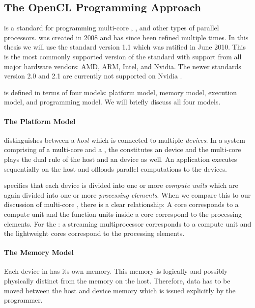 

\subsection{The OpenCL Programming Approach}
\OpenCL is a standard for programming multi-core \CPUs, \GPUs, and other types of parallel processors.
\OpenCL was created in 2008 and has since been refined multiple times.
In this thesis we will use the \OpenCL standard version 1.1 which was ratified in June 2010.
This is the most commonly supported version of the standard with support from all major hardware vendors: AMD, ARM, Intel, and Nvidia.
The newer \OpenCL standards version 2.0 and 2.1 are currently not supported on Nvidia \GPUs.

\OpenCL is defined in terms of four models: platform model, memory model, execution model, and programming model.
We will briefly discuss all four models.

\paragraph{The \OpenCL Platform Model}
\OpenCL distinguishes between a \emph{host} which is connected to multiple \emph{\OpenCL devices}.
In a system comprising of a multi-core \CPU and a \GPU, the \GPU constitutes an \OpenCL device and the multi-core \CPU plays the dual rule of the host and an \OpenCL device as well.
An \OpenCL application executes sequentially on the host and offloads parallel computations to the \OpenCL devices.

\OpenCL specifies that each device is divided into one or more \emph{compute units} which are again divided into one or more \emph{processing elements}.
When we compare this to our discussion of multi-core \CPUs, there is a clear relationship: A \CPU core corresponds to a compute unit and the function units inside a \CPU core correspond to the processing elements.
For the \GPU: a streaming multiprocessor corresponds to a compute unit and the lightweight \GPU cores correspond to the processing elements.


\paragraph{The \OpenCL Memory Model}
Each device in \OpenCL has its own memory.
This memory is logically and possibly physically distinct from the memory on the host.
Therefore, data has to be moved between the host and device memory which is issued explicitly by the programmer.

